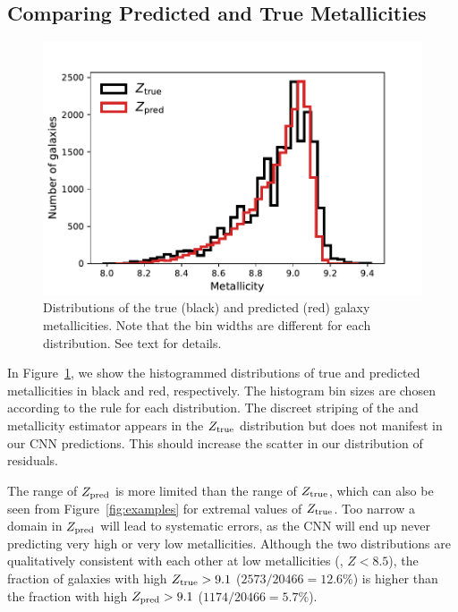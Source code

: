 \documentclass[fleqn,usenatbib]{mnras}
\begin{document}
\subsection{Comparing Predicted and True Metallicities}
\begin{figure}
	\includegraphics[width=\columnwidth]{03-Z_distribution.pdf}
	\caption{\label{fig:distributions}
		Distributions of the true (black) and predicted (red) galaxy metallicities. Note that the bin widths are different for each distribution. See text for details.}
\end{figure}

In Figure~\ref{fig:distributions}, we show the histogrammed distributions of true and predicted metallicities in black and red, respectively. The histogram bin sizes are chosen according to the \cite{Freedman1981} rule for each distribution. The discreet striping of the \cite{Tremonti2004} and \cite{Brinchmann2004} metallicity estimator appears in the $Z_{\rm true}$ distribution but does not manifest in our CNN predictions. This should increase the scatter in our distribution of residuals.

The range of $Z_{\rm pred}$ is more limited than the range of $Z_{\rm true}$, which can also be seen from Figure~\ref{fig:examples} for extremal values of $Z_{\rm true}$. Too narrow a domain in $Z_{\rm pred}$ will lead to systematic errors, as the CNN will end up never predicting very high or very low metallicities. Although the two distributions are qualitatively consistent with each other at low metallicities (\eg, $Z < 8.5$), the fraction of galaxies with high $Z_{\rm true} > 9.1$ ($2573/20466 = 12.6\%$) is higher than the fraction with high $Z_{\rm pred} > 9.1$ ($1174/20466 = 5.7\%$).
\end{document}
